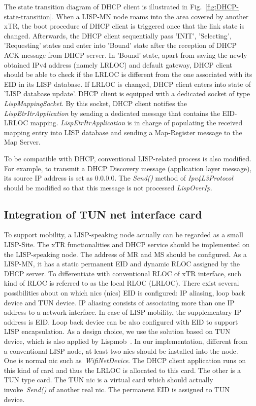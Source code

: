 The state transition diagram of DHCP client is illustrated in Fig.~\ref{fig:DHCP-state-transition}. When a LISP-MN node roams into the area covered by another xTR, the boot procedure of DHCP client is triggered once that the link state is changed. Afterwards, the DHCP client sequentially pass 'INIT', 'Selecting', 'Requesting' states and enter into 'Bound' state after the reception of DHCP ACK message from DHCP server. In 'Bound' state, apart from saving the newly obtained IPv4 address (namely LRLOC) and default gateway, DHCP client should be able to check if the LRLOC is different from the one associated with its EID in its LISP database. If LRLOC is changed, DHCP client enters into state of 'LISP database update'. DHCP client is equipped with a dedicated socket of type \emph{LispMappingSocket}. By this socket, DHCP client notifies the \emph{LispEtrItrApplication} by sending a dedicated message that contains the EID-LRLOC mapping. \emph{LispEtrItrApplication} is in charge of populating the received mapping entry into LISP database and sending a Map-Register message to the Map Server.

To be compatible with DHCP, conventional LISP-related process is also modified. For example, to transmit a DHCP Discovery message (application layer message), its source IP address is set as $0.0.0.0$. The \emph{Send()} method of \emph{Ipv4L3Protocol} should be modified so that this message is not processed \emph{LispOverIp}.

\subsection{Integration of TUN net interface card}
\label{subsec:tundevice}
To support mobility, a LISP-speaking node actually can be regarded as a small LISP-Site. The xTR functionalities and DHCP service should be implemented on the LISP-speaking node. The address of MR and MS should be configured. As a LISP-MN, it has a static permanent EID and dynamic RLOC assigned by the DHCP server. To differentiate with conventional RLOC of xTR interface, such kind of RLOC is referred to as the local RLOC (LRLOC). There exist several possibilities about on which \acrlong{nic}s (\acrshort{nic}s) EID is configured: IP aliasing, loop back device and TUN device. IP aliasing consists of associating more than one IP address to a network interface. In case of LISP mobility, the supplementary IP address is EID. Loop back device can be also configured with EID to support LISP encapsulation. As a design choice, we use the solution based on TUN device, which is also applied by Lispmob~\cite{LISPmob}. In our implementation, different from a conventional LISP node, at least two \acrshort{nic}s should be installed into the node. One is normal \acrshort{nic} such as~\emph{WifiNetDevice}. The DHCP client application runs on this kind of card and thus the LRLOC is allocated to this card. The other is a TUN type card. The TUN \acrshort{nic} is a virtual card which should actually invoke~\emph{Send()} of another real \acrshort{nic}. The permanent EID is assigned to TUN device. 

